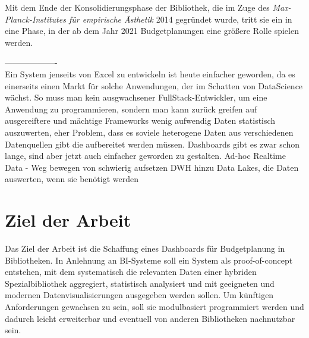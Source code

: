 Mit dem Ende der Konsolidierungsphase der
Bibliothek, die im Zuge des \textit{Max-Planck-Institutes für empirische
Ästhetik} 2014 gegründet wurde, tritt sie ein in eine Phase, in der ab dem Jahr
2021 Budgetplanungen eine größere Rolle spielen werden.

-------------------\\
Ein System jenseits von Excel zu entwickeln ist heute einfacher geworden, da es einerseits einen Markt für
solche Anwendungen, der im Schatten von DataScience wächst. So muss man kein ausgwachsener FullStack-Entwickler,
um eine Anwendung zu programmieren,
sondern man kann zurück greifen auf ausgereiftere und mächtige Frameworks
wenig aufwendig Daten statistisch auszuwerten, eher Problem, dass es soviele heterogene Daten aus verschiedenen Datenquellen
gibt die aufbereitet werden müssen. Dashboards gibt es zwar schon lange, sind aber jetzt auch einfacher geworden zu gestalten.
Ad-hoc Realtime Data - Weg bewegen von schwierig aufsetzen DWH hinzu Data Lakes, die Daten auswerten, wenn sie benötigt werden


\section{Ziel der Arbeit}
Das Ziel der Arbeit ist die Schaffung eines Dashboards für Budgetplanung in Bibliotheken. 
In Anlehnung an \acrfull{BI}-Systeme soll ein System als proof-of-concept entstehen,
mit dem systematisch die relevanten Daten einer hybriden Spezialbibliothek aggregiert, statistisch
analysiert und mit geeigneten und modernen Datenvisualisierungen ausgegeben werden sollen.
Um künftigen Anforderungen gewachsen zu sein, soll sie
modulbasiert programmiert werden und dadurch leicht erweiterbar und eventuell von
anderen Bibliotheken nachnutzbar sein.

